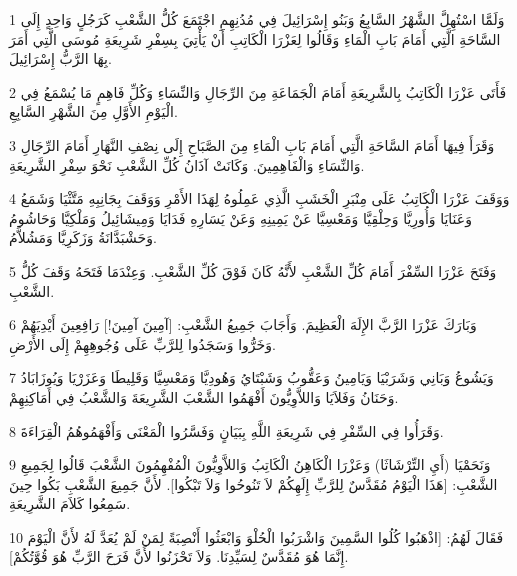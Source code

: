 \par 1 وَلَمَّا اسْتُهِلَّ الشَّهْرُ السَّابِعُ وَبَنُو إِسْرَائِيلَ فِي مُدُنِهِمِ اجْتَمَعَ كُلُّ الشَّعْبِ كَرَجُلٍ وَاحِدٍ إِلَى السَّاحَةِ الَّتِي أَمَامَ بَابِ الْمَاءِ وَقَالُوا لِعَزْرَا الْكَاتِبِ أَنْ يَأْتِيَ بِسِفْرِ شَرِيعَةِ مُوسَى الَّتِي أَمَرَ بِهَا الرَّبُّ إِسْرَائِيلَ.
\par 2 فَأَتَى عَزْرَا الْكَاتِبُ بِالشَّرِيعَةِ أَمَامَ الْجَمَاعَةِ مِنَ الرِّجَالِ وَالنِّسَاءِ وَكُلِّ فَاهِمٍ مَا يُسْمَعُ فِي الْيَوْمِ الأَوَّلِ مِنَ الشَّهْرِ السَّابِعِ.
\par 3 وَقَرَأَ فِيهَا أَمَامَ السَّاحَةِ الَّتِي أَمَامَ بَابِ الْمَاءِ مِنَ الصَّبَاحِ إِلَى نِصْفِ النَّهَارِ أَمَامَ الرِّجَالِ وَالنِّسَاءِ وَالْفَاهِمِينَ. وَكَانَتْ آذَانُ كُلِّ الشَّعْبِ نَحْوَ سِفْرِ الشَّرِيعَةِ.
\par 4 وَوَقَفَ عَزْرَا الْكَاتِبُ عَلَى مِنْبَرِ الْخَشَبِ الَّذِي عَمِلُوهُ لِهَذَا الأَمْرِ وَوَقَفَ بِجَانِبِهِ مَتَّثْيَا وَشَمَعُ وَعَنَايَا وَأُورِيَّا وَحِلْقِيَّا وَمَعْسِيَّا عَنْ يَمِينِهِ وَعَنْ يَسَارِهِ فَدَايَا وَمِيشَائِيلُ وَمَلْكِيَّا وَحَاشُومُ وَحَشْبَدَّانَةُ وَزَكَرِيَّا وَمَشُلاَّمُ.
\par 5 وَفَتَحَ عَزْرَا السِّفْرَ أَمَامَ كُلِّ الشَّعْبِ لأَنَّهُ كَانَ فَوْقَ كُلِّ الشَّعْبِ. وَعِنْدَمَا فَتَحَهُ وَقَفَ كُلُّ الشَّعْبِ.
\par 6 وَبَارَكَ عَزْرَا الرَّبَّ الإِلَهَ الْعَظِيمَ. وَأَجَابَ جَمِيعُ الشَّعْبِ: [آمِينَ آمِينَ!] رَافِعِينَ أَيْدِيَهُمْ وَخَرُّوا وَسَجَدُوا لِلرَّبِّ عَلَى وُجُوهِهِمْ إِلَى الأَرْضِ.
\par 7 وَيَشُوعُ وَبَانِي وَشَرَبْيَا وَيَامِينُ وَعَقُّوبُ وَشَبْتَايُ وَهُودِيَّا وَمَعْسِيَّا وَقَلِيطَا وَعَزَرْيَا وَيُوزَابَادُ وَحَنَانُ وَفَلاَيَا وَاللاَّوِيُّونَ أَفْهَمُوا الشَّعْبَ الشَّرِيعَةَ وَالشَّعْبُ فِي أَمَاكِنِهِمْ.
\par 8 وَقَرَأُوا فِي السِّفْرِ فِي شَرِيعَةِ اللَّهِ بِبَيَانٍ وَفَسَّرُوا الْمَعْنَى وَأَفْهَمُوهُمُ الْقِرَاءَةَ.
\par 9 وَنَحَمْيَا (أَيِ التِّرْشَاثَا) وَعَزْرَا الْكَاهِنُ الْكَاتِبُ وَاللاَّوِيُّونَ الْمُفْهِمُونَ الشَّعْبَ قَالُوا لِجَمِيعِ الشَّعْبِ: [هَذَا الْيَوْمُ مُقَدَّسٌ لِلرَّبِّ إِلَهِكُمْ لاَ تَنُوحُوا وَلاَ تَبْكُوا]. لأَنَّ جَمِيعَ الشَّعْبِ بَكُوا حِينَ سَمِعُوا كَلاَمَ الشَّرِيعَةِ.
\par 10 فَقَالَ لَهُمُ: [اذْهَبُوا كُلُوا السَّمِينَ وَاشْرَبُوا الْحُلْوَ وَابْعَثُوا أَنْصِبَةً لِمَنْ لَمْ يُعَدَّ لَهُ لأَنَّ الْيَوْمَ إِنَّمَا هُوَ مُقَدَّسٌ لِسَيِّدِنَا. وَلاَ تَحْزَنُوا لأَنَّ فَرَحَ الرَّبِّ هُوَ قُوَّتُكُمْ].
